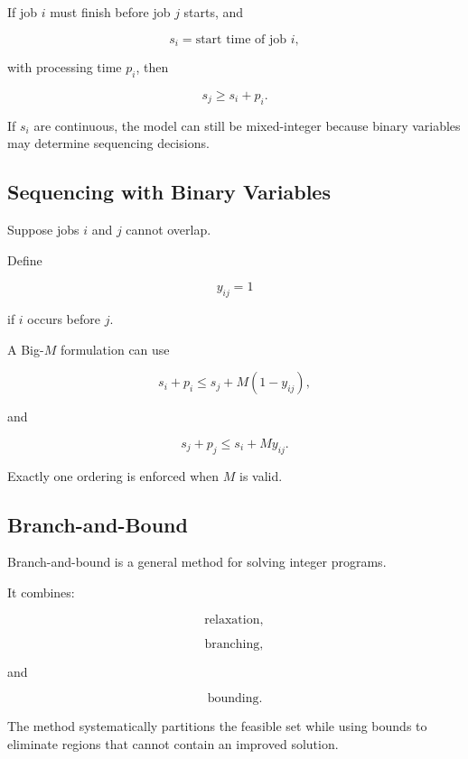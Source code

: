 If job \(i\) must finish before job \(j\) starts, and

\[
s_i
=
\text{start time of job }i,
\]

with processing time \(p_i\), then

\[
\boxed{
s_j
\geq
s_i+p_i.
}
\]

If \(s_i\) are continuous, the model can still be mixed-integer because
binary variables may determine sequencing decisions.

\subsection{Sequencing with Binary Variables}
\label{subsec:sequencing-binary-variables}

Suppose jobs \(i\) and \(j\) cannot overlap.

Define

\[
y_{ij}
=
1
\]

if \(i\) occurs before \(j\).

A Big-\(M\) formulation can use

\[
\boxed{
s_i+p_i
\leq
s_j+M(1-y_{ij}),
}
\]

and

\[
\boxed{
s_j+p_j
\leq
s_i+My_{ij}.
}
\]

Exactly one ordering is enforced when \(M\) is valid.

\subsection{Branch-and-Bound}
\label{subsec:branch-and-bound}

Branch-and-bound is a general method for solving integer programs.

It combines:

\[
\boxed{
\text{relaxation},
}
\]

\[
\boxed{
\text{branching},
}
\]

and

\[
\boxed{
\text{bounding}.
}
\]

The method systematically partitions the feasible set while using bounds
to eliminate regions that cannot contain an improved solution.

